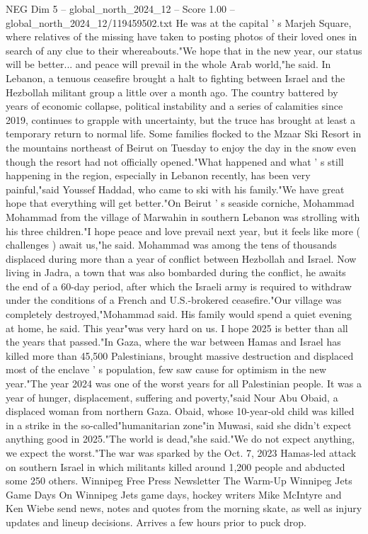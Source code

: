 \begin{textsample}{NEG Dim 5 – global\_north\_2024\_12 – Score 1.00 – global\_north\_2024\_12/119459502.txt}
He was at the capital ' s Marjeh Square, where relatives of the missing have taken to posting photos of their loved ones in search of any clue to their whereabouts."We hope that in the new year, our status will be better... and peace will prevail in the whole Arab world,"he said.
In Lebanon, a tenuous ceasefire brought a halt to fighting between Israel and the Hezbollah militant group a little over a month ago.
The country battered by years of economic collapse, political instability and a series of calamities since 2019, continues to grapple with uncertainty, but the truce has brought at least a temporary return to normal life.
Some families flocked to the Mzaar Ski Resort in the mountains northeast of Beirut on Tuesday to enjoy the day in the snow even though the resort had not officially opened."What happened and what ' s still happening in the region, especially in Lebanon recently, has been very painful,"said Youssef Haddad, who came to ski with his family."We have great hope that everything will get better."On Beirut ' s seaside corniche, Mohammad Mohammad from the village of Marwahin in southern Lebanon was strolling with his three children."I hope peace and love prevail next year, but it feels like more ( challenges ) await us,"he said.
Mohammad was among the tens of thousands displaced during more than a year of conflict between Hezbollah and Israel.
Now living in Jadra, a town that was also bombarded during the conflict, he awaits the end of a 60-day period, after which the Israeli army is required to withdraw under the conditions of a French and U.S.-brokered ceasefire."Our village was completely destroyed,"Mohammad said.
His family would spend a quiet evening at home, he said.
This year"was very hard on us.
I hope 2025 is better than all the years that passed."In Gaza, where the war between Hamas and Israel has killed more than 45,500 Palestinians, brought massive destruction and displaced most of the enclave ' s population, few saw cause for optimism in the new year."The year 2024 was one of the worst years for all Palestinian people.
It was a year of hunger, displacement, suffering and poverty,"said Nour Abu Obaid, a displaced woman from northern Gaza.
Obaid, whose 10-year-old child was killed in a strike in the so-called"humanitarian zone"in Muwasi, said she didn't expect anything good in 2025."The world is dead,"she said."We do not expect anything, we expect the worst."The war was sparked by the Oct. 7, 2023 Hamas-led attack on southern Israel in which militants killed around 1,200 people and abducted some 250 others.
Winnipeg Free Press Newsletter The Warm-Up Winnipeg Jets Game Days On Winnipeg Jets game days, hockey writers Mike McIntyre and Ken Wiebe send news, notes and quotes from the morning skate, as well as injury updates and lineup decisions.
Arrives a few hours prior to puck drop.

\end{textsample}
